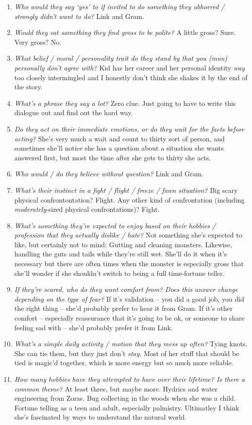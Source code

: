 \begin{enumerate}
    \item \textit{Who would they say ‘yes’ to if invited to do something they abhorred / strongly didn’t want to do?}
      Link and Gram. 
    \item \textit{Would they eat something they find gross to be polite?}
      A little gross? Sure. Very gross? No.
    \item \textit{What belief / moral / personality trait do they stand by that you (mun) personally don’t agree with?}
      Kid has her career and her personal identity \emph{way} too closely intermingled and I honestly don't think she shakes it by the end of the story.
    \item \textit{What’s a phrase they say a lot?}
      Zero clue. Just going to have to write this dialogue out and find out the hard way.
    \item \textit{Do they act on their immediate emotions, or do they wait for the facts before acting?}
      She's very much a wait and count to thirty sort of person, and sometimes she'll notice she has a question about a situation she wants answered first, but most the time after she gets to thirty she acts.
    \item \textit{Who would / do they believe without question?}
      Link and Gram.
    \item \textit{What’s their instinct in a fight / flight / freeze / fawn situation?}
      Big scary physical confrontontation? Flight. Any other kind of confrontation (including \emph{moderately}-sized physical confrontations)? Fight.
    \item \textit{What’s something they’re expected to enjoy based on their hobbies / profession that they actually dislike / hate?}\label{irene:characterq:workhates} 
      Not something she's expected to like, but certainly not to mind: Gutting and cleaning monsters. Likewise, handling the guts and tails while they're still wet. She'll do it when it's necessary but there are often times when the monster is especially gross that she'll wonder if she shouldn't switch to being a full time-fortune teller.
    \item \textit{If they’re scared, who do they want comfort from? Does this answer change depending on the type of fear?}
      If it's validation -- you did a good job, you did the right thing -- she'd probably prefer to hear it from Gram. If it's other comfort -- especially reassurance that it's going to be ok, or someone to share feeling sad with -- she'd probably prefer it from Link.
    \item \textit{What’s a simple daily activity / motion that they mess up often?}
      Tying knots. She can tie them, but they just don't \emph{stay}. Most of her stuff that should be tied is magic'd together, which is more energy but so much more reliable.    
    \item \textit{How many hobbies have they attempted to have over their lifetime? Is there a common theme?}
      At least three, but maybe more. Hydrics and water engineering from Zoras. Bug collecting in the woods when she was a child. Fortune telling as a teen and adult, especially palmistry. Ultimatley I think she's fascinated by ways to understand the natural world.
  \end{enumerate}